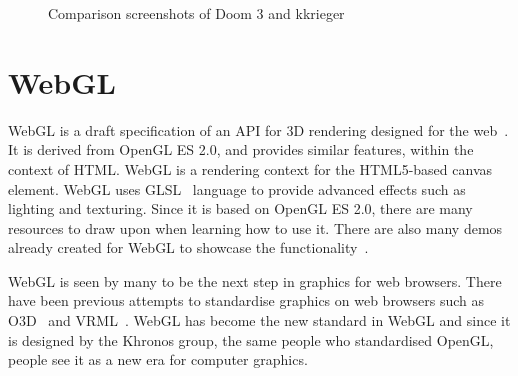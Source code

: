 \documentclass[12pt]{article}
\begin{document}
\begin{figure}
  \centering
  \caption{Comparison screenshots of Doom 3 and kkrieger}
  \label{fig:kkriegerdoomcomp}
\end{figure}

\section{WebGL}
WebGL is a draft specification of an API for 3D rendering designed for the web~\cite{web:webglspec}.
It is derived from OpenGL ES 2.0, and provides similar features, within the context of HTML.
WebGL is a rendering context for the HTML5-based canvas element.
WebGL uses GLSL~\cite{web:glsl} language to provide advanced effects such as lighting and texturing.
Since it is based on OpenGL ES 2.0, there are many resources to draw upon when learning how to use it.
There are also many demos already created for WebGL to showcase the functionality~\cite{web:chromeexperiments}.

WebGL is seen by many to be the next step in graphics for web browsers. 
There have been previous attempts to standardise graphics on web browsers such as O3D~\cite{web:o3d} and VRML~\cite{web:vrml}.
WebGL has become the new standard in WebGL and since it is designed by the Khronos group, the same people who standardised OpenGL, people see it as a new era for computer graphics.
\end{document}
